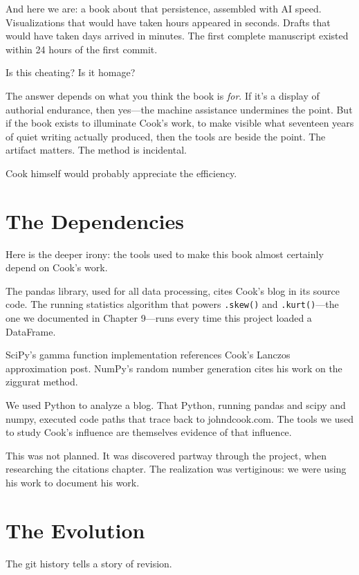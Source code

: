And here we are: a book about that persistence, assembled with AI speed. Visualizations that would have taken hours appeared in seconds. Drafts that would have taken days arrived in minutes. The first complete manuscript existed within 24 hours of the first commit.

Is this cheating? Is it homage?

The answer depends on what you think the book is \textit{for}. If it's a display of authorial endurance, then yes—the machine assistance undermines the point. But if the book exists to illuminate Cook's work, to make visible what seventeen years of quiet writing actually produced, then the tools are beside the point. The artifact matters. The method is incidental.

Cook himself would probably appreciate the efficiency.

\bigskip

\section*{The Dependencies}

Here is the deeper irony: the tools used to make this book almost certainly depend on Cook's work.

The pandas library, used for all data processing, cites Cook's blog in its source code. The running statistics algorithm that powers \texttt{.skew()} and \texttt{.kurt()}—the one we documented in Chapter 9—runs every time this project loaded a DataFrame.

SciPy's gamma function implementation references Cook's Lanczos approximation post. NumPy's random number generation cites his work on the ziggurat method.

We used Python to analyze a blog. That Python, running pandas and scipy and numpy, executed code paths that trace back to johndcook.com. The tools we used to study Cook's influence are themselves evidence of that influence.

This was not planned. It was discovered partway through the project, when researching the citations chapter. The realization was vertiginous: we were using his work to document his work.

\bigskip

\section*{The Evolution}

The git history tells a story of revision.

